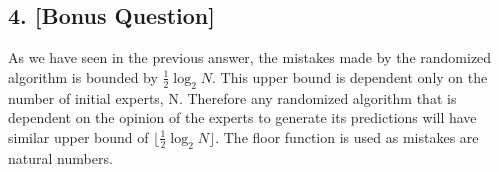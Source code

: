 \documentclass{article}
\begin{document}
\subsection*{4. [Bonus Question]}
As we have seen in the previous answer, the mistakes made by the randomized algorithm is bounded by \( \frac{1}{2}\log_2{N} \).  This upper bound is dependent only on the number of initial experts, N.  Therefore any randomized algorithm that is dependent on the opinion of the experts to generate its predictions will have similar upper bound of \( \lfloor \frac{1}{2}\log_2{N} \rfloor \).  The floor function is used as mistakes are natural numbers.
\end{document}
